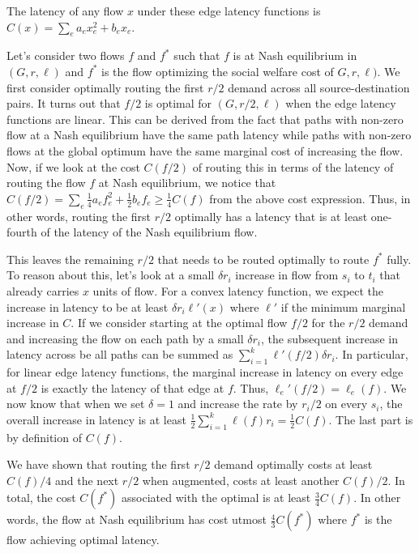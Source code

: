 \begin{proof-sketch}
    The latency of any flow $x$ under these edge latency functions is $C(x) = \displaystyle \sum_e a_ex^2_e + b_ex_e$.

    Let's consider two flows $f$ and $f^*$ such that $f$ is at Nash equilibrium in $(G, r, \ell)$ and $f^*$ is the flow optimizing the social welfare cost of $G,r,\ell)$. We first consider optimally routing the first $r/2$ demand 
    across all source-destination pairs. It turns out that $f/2$ is optimal for $(G, r/2,\ell)$ when the edge latency functions are linear. This can be derived from the fact that paths with
    non-zero flow at a Nash equilibrium have the same path latency while paths with non-zero flows at the global optimum have the same marginal cost of increasing the flow. Now, if we look at the cost
    $C(f/2)$ of routing this in terms of the latency of routing the flow $f$ at Nash equilibrium, we notice that $C(f/2) = \displaystyle \sum_e \frac{1}{4}a_ef^2_e + \frac{1}{2}b_ef_e \geq \frac{1}{4}C(f)$
    from the above cost expression. Thus, in other words, routing the first $r/2$ optimally has a latency that is at least one-fourth of the latency of the Nash equilibrium flow.

    This leaves the remaining $r/2$ that needs to be routed optimally to route $f^*$ fully. To reason about this, let's look at a small $\delta r_i$ increase in flow from $s_i$ to $t_i$ that already carries $x$ units 
    of flow. For a convex latency function, we expect the increase in latency to be at least $\delta r_i\ell'(x)$ where $\ell'$ if the minimum marginal increase in $C$. If we consider starting at the 
    optimal flow $f/2$ for the $r/2$ demand and increasing the flow on each path by a small $\delta r_i$, the subsequent increase in 
    latency across be all paths can be summed as  $\displaystyle \sum_{i = 1}^k\ell'(f/2)\delta r_i$. In particular, for linear edge latency functions, the marginal increase in latency on every edge at $f/2$ is exactly
    the latency of that edge at $f$. Thus, $\ell_e'(f/2) = \ell_e(f)$. We now know that when we set $\delta = 1$ and increase the rate by $r_i/2$ on every $s_i$, the overall increase in latency is at least $\displaystyle \frac{1}{2}\sum_{i= 1}^k\ell(f)r_i = \frac{1}{2}C(f)$. The last part is by definition of $C(f)$. 
    
    We have shown that routing the first $r/2$ demand optimally costs at least $C(f)/4$ and the next $r/2$ when augmented, costs at least another $C(f)/2$. In total, the cost $C(f^*)$ associated with the optimal is at least $\frac{3}{4}C(f)$. In other words,
    the flow at Nash equilibrium has cost utmost $\frac{4}{3}C(f^*)$ where $f^*$ is the flow achieving optimal latency.
\end{proof-sketch}
